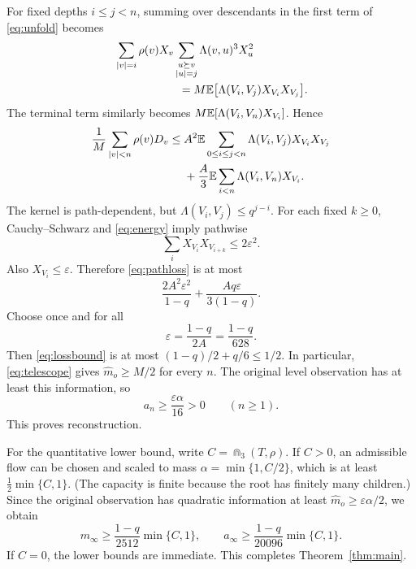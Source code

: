 For fixed depths $i\le j<n$, summing over descendants in the first
term of \eqref{eq:unfold} becomes
\begin{align*}
&\sum_{|v|=i}\rho(v)X_v
\sum_{\substack{u\succeq v\\|u|=j}}\Lambda(v,u)^3X_u^2\\
&\hspace{20mm}=M\E\bigl[\Lambda(V_i,V_j)X_{V_i}X_{V_j}\bigr].
\end{align*}
The terminal term similarly becomes
$M\mathbb E[\Lambda(V_i,V_n)X_{V_i}]$.
Hence
\begin{align}
\frac1M\sum_{|v|<n}\rho(v)D_v
\le{}& A^2\mathbb E\sum_{0\le i\le j<n}
\Lambda(V_i,V_j)X_{V_i}X_{V_j}\notag\\
&+\frac A3\mathbb E\sum_{i<n}\Lambda(V_i,V_n)X_{V_i}.
\label{eq:pathloss}
\end{align}
The kernel is path-dependent, but
$\Lambda(V_i,V_j)\le q^{j-i}$. For each fixed $k\ge0$,
Cauchy--Schwarz and \eqref{eq:energy} imply pathwise
\[
\sum_i X_{V_i}X_{V_{i+k}}\le2\varepsilon^2.
\]
Also $X_{V_i}\le\varepsilon$. Therefore \eqref{eq:pathloss} is at
most
\begin{equation}\label{eq:lossbound}
\frac{2A^2\varepsilon^2}{1-q}
+\frac{Aq\varepsilon}{3(1-q)}.
\end{equation}
Choose once and for all
\begin{equation}\label{eq:eps}
\varepsilon=\frac{1-q}{2A}=\frac{1-q}{628}.
\end{equation}
Then \eqref{eq:lossbound} is at most
$(1-q)/2+q/6\le1/2$. In particular, \eqref{eq:telescope} gives
$\widehat m_o\ge M/2$ for every $n$. The original level observation
has at least this information, so
\begin{equation}\label{eq:advantage}
a_n\ge\frac{\varepsilon\alpha}{16}>0\qquad(n\ge1).
\end{equation}
This proves reconstruction.

For the quantitative lower bound, write $C=\Cap_3(T,\rho)$.
If $C>0$, an admissible flow can be chosen and scaled to mass
$\alpha=\min\{1,C/2\}$, which is at least
$\tfrac12\min\{C,1\}$. (The capacity is finite because
the root has finitely many children.) Since the original observation has
quadratic information at least $\widehat m_o\ge\varepsilon\alpha/2$,
we obtain
\[
 m_\infty\ge\frac{1-q}{2512}\min\{C,1\},
 \qquad
 a_\infty\ge\frac{1-q}{20096}\min\{C,1\}.
\]
If $C=0$, the lower bounds are immediate. This completes
Theorem~\ref{thm:main}.

